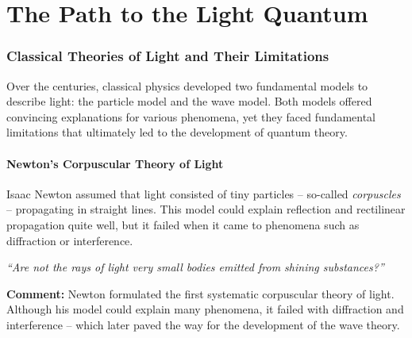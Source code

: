 \chapter{The Path to the Light Quantum}

\setcounter{section}{2}
\setcounter{subsection}{0}
\setcounter{subsubsection}{1}
\setcounter{secnumdepth}{3}

\subsection{Classical Theories of Light and Their Limitations}

Over the centuries, classical physics developed two fundamental models to describe light: the particle model and the wave model. Both models offered convincing explanations for various phenomena, yet they faced fundamental limitations that ultimately led to the development of quantum theory.

\subsubsection{Newton's Corpuscular Theory of Light}
Isaac Newton assumed that light consisted of tiny particles – so-called \emph{corpuscles} – propagating in straight lines. This model could explain reflection and rectilinear propagation quite well, but it failed when it came to phenomena such as diffraction or interference.

\vspace{1em}
\begin{tcolorbox}[physikbox, title=Isaac Newton (1704) – Corpuscular Theory\textit{ \cite{newton_opticks}}]
	\label{box:newton}
	
	\emph{“Are not the rays of light very small bodies emitted from shining substances?”}
	
	\vspace{6pt}
	\textbf{Comment:} Newton formulated the first systematic corpuscular theory of light. Although his model could explain many phenomena, it failed with diffraction and interference – which later paved the way for the development of the wave theory.
\end{tcolorbox}
